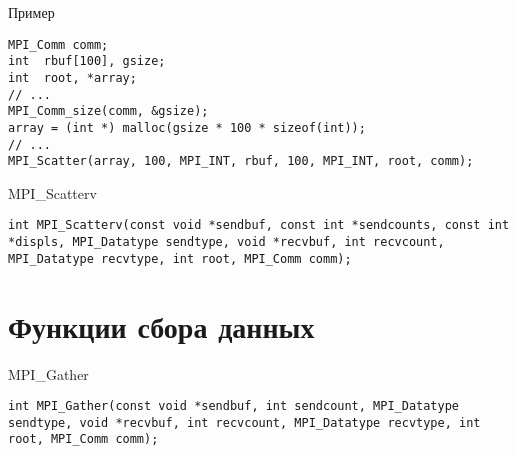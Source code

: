 \begin{frame}

\begin{figure}[htp]
    \centering
\end{figure}

\end{frame}

\begin{frame}[fragile]{Пример}

\begin{lstlisting}
MPI_Comm comm;
int  rbuf[100], gsize;
int  root, *array;
// ...
MPI_Comm_size(comm, &gsize);
array = (int *) malloc(gsize * 100 * sizeof(int));
// ...
MPI_Scatter(array, 100, MPI_INT, rbuf, 100, MPI_INT, root, comm);
\end{lstlisting}

\end{frame}

\begin{frame}[fragile]{MPI_Scatterv}

\begin{lstlisting}
int MPI_Scatterv(const void *sendbuf, const int *sendcounts, const int *displs, MPI_Datatype sendtype, void *recvbuf, int recvcount, MPI_Datatype recvtype, int root, MPI_Comm comm);
\end{lstlisting}

\end{frame}

\section{Функции сбора данных}

\begin{frame}[fragile]{MPI_Gather}

\begin{lstlisting}
int MPI_Gather(const void *sendbuf, int sendcount, MPI_Datatype sendtype, void *recvbuf, int recvcount, MPI_Datatype recvtype, int root, MPI_Comm comm);
\end{lstlisting}

\end{frame}

